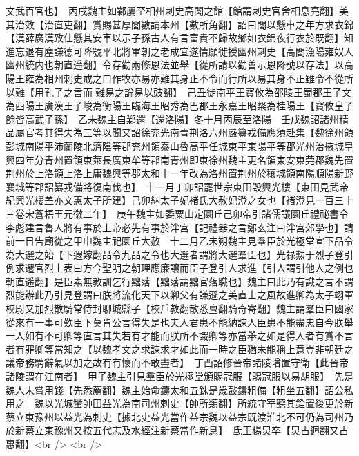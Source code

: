 文武百官也】　丙戌魏主如鄴屢至相州刺史高閭之館【館謂刺史官舍相息亮翻】美其治效【治直吏翻】賞賜甚厚閭數請本州【數所角翻】詔曰閭以懸車之年方求衣錦【漢薛廣漢致仕懸其安車以示子孫古人有言富貴不歸故鄉如衣錦夜行衣於既翻】知進忘退有塵謙德可降號平北將軍朝之老成宜遂情願徙授幽州刺史【高閭漁陽雍奴人幽州統内也朝直遥翻】令存勸兩修恩法並舉【從所請以勸善示恩降號以存法】以高陽王雍為相州刺史戒之曰作牧亦易亦難其身正不令而行所以易其身不正雖令不從所以難【用孔子之言而難易之論易以豉翻】　己丑徙南平王寶攸為邵陵王蜀郡王子文為西陽王廣漢王子峻為衡陽王臨海王昭秀為巴郡王永嘉王昭粲為桂陽王【寶攸皇子餘皆高武子孫】　乙未魏主自鄴還【還洛陽】冬十月丙辰至洛陽　壬戌魏詔諸州精品屬官考其得失為三等以聞又詔徐兖光南青荆洛六州嚴纂戎備應須赴集【魏徐州領彭城南陽平沛蘭陵北濟陰等郡兖州領泰山魯高平任城東平東陽平等郡光州治掖城皇興四年分青州置領東萊長廣東牟等郡南青州即東徐州魏主更名領東安東莞郡魏先置荆州於上洛領上洛上庸魏興等郡太和十一年改為洛州置荆州於穰城領南陽順陽新野襄城等郡詔纂戎備將復南伐也】　十一月丁卯詔罷世宗東田毁興光樓【東田見武帝紀興光樓盖亦文惠太子所建】己卯納太子妃禇氏大赦妃澄之女也【禇澄見一百三十三卷宋蒼梧王元徽二年】　庚午魏主如委粟山定圜丘己卯帝引諸儒議圜丘禮祕書令李彪建言魯人將有事於上帝必先有事於泮宫【記禮器之言鄭玄注曰泮宫郊學也】請前一日告廟從之甲申魏主祀圜丘大赦　十二月乙未朔魏主見羣臣於光極堂宣下品令為大選之始【下遐嫁翻品令九品之令也大選者謂將大選羣臣也】光禄勲于烈子登引例求遷官烈上表曰方今聖明之朝理應廉讓而臣子登引人求進【引人謂引他人之例也朝直遥翻】是臣素無教訓乞行黜落【黜落謂黜官落職也】魏主曰此乃有識之言不謂烈能辦此乃引見登謂曰朕將流化天下以卿父有謙遜之美直士之風故進卿為太子翊軍校尉又加烈散騎常侍封聊城縣子【校戶教翻散悉亶翻騎奇寄翻】魏主謂羣臣曰國家從來有一事可歎臣下莫肯公言得失是也夫人君患不能納諫人臣患不能盡忠自今朕舉一人如有不可卿等直言其失若有才能而朕所不識卿等亦當舉之如是得人者有賞不言者有罪卿等當知之【以魏孝文之求諫求才如此而一時之臣猶未能稱上意豈非朝廷之議帝務騁辭氣以加之故有有懷而不敢盡者】　丁酉詔修晉帝諸陵增置守衛【此晉帝諸陵謂在江南者】　甲子魏主引見羣臣於光極堂頒賜冠服【賜冠服以易胡服】　先是魏人未嘗用錢【先悉薦翻】魏主始命鑄太和五銖是歲鼔鑄粗備【粗坐五翻】詔公私用之　魏以光城蠻帥田益光為南司州刺史【帥所類翻】所統守宰聽其銓置後更於新蔡立東豫州以益光為刺史【據北史益光當作益宗魏以益宗既渡淮北不可仍為司州乃於新蔡立東豫州又按五代志及水經注新蔡當作新息】　氐王楊炅卒【炅古迥翻又古惠翻】<br />
<br />

